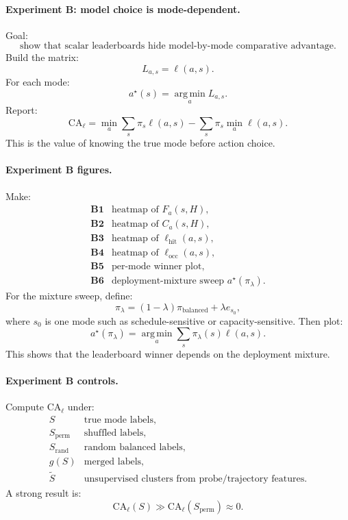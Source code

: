 \documentclass{article}
\providecommand{\argmin}{\operatorname*{arg\,min}}
\begin{document}
\paragraph{Experiment B: model choice is mode-dependent.}
Goal:
\[
    \text{show that scalar leaderboards hide model-by-mode comparative advantage.}
\]
Build the matrix:
\[
    L_{a,s}=\ell(a,s).
\]
For each mode:
\[
    a^\star(s)=\argmin_a L_{a,s}.
\]
Report:
\[
    \mathrm{CA}_{\ell}
    =
    \min_a\sum_s\pi_s\ell(a,s)
    -
    \sum_s\pi_s\min_a\ell(a,s).
\]
This is the value of knowing the true mode before action choice.

\paragraph{Experiment B figures.}
Make:
\[
\begin{array}{ll}
    \textbf{B1} & \text{heatmap of \(F_a(s,H)\)},\\
    \textbf{B2} & \text{heatmap of \(C_a(s,H)\)},\\
    \textbf{B3} & \text{heatmap of \(\ell_{\mathrm{hit}}(a,s)\)},\\
    \textbf{B4} & \text{heatmap of \(\ell_{\mathrm{occ}}(a,s)\)},\\
    \textbf{B5} & \text{per-mode winner plot},\\
    \textbf{B6} & \text{deployment-mixture sweep \(a^\star(\pi_\lambda)\)}.
\end{array}
\]
For the mixture sweep, define:
\[
    \pi_\lambda
    =
    (1-\lambda)\pi_{\mathrm{balanced}}
    +
    \lambda e_{s_0},
\]
where \(s_0\) is one mode such as schedule-sensitive or capacity-sensitive.
Then plot:
\[
    a^\star(\pi_\lambda)
    =
    \argmin_a\sum_s\pi_\lambda(s)\ell(a,s).
\]
This shows that the leaderboard winner depends on the deployment mixture.

\paragraph{Experiment B controls.}
Compute \(\mathrm{CA}_{\ell}\) under:
\[
\begin{array}{ll}
    S & \text{true mode labels},\\
    S_{\mathrm{perm}} & \text{shuffled labels},\\
    S_{\mathrm{rand}} & \text{random balanced labels},\\
    g(S) & \text{merged labels},\\
    \tilde S & \text{unsupervised clusters from probe/trajectory features}.
\end{array}
\]
A strong result is:
\[
    \mathrm{CA}_{\ell}(S)
    \gg
    \mathrm{CA}_{\ell}(S_{\mathrm{perm}})
    \approx
    0.
\]
\end{document}

